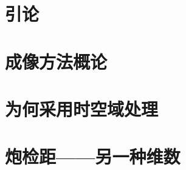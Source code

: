%
%




\pagestyle{empty}

\frontmatter

%


\tableofcontents
\cleardoublepage
{}
\listoffigures
\cleardoublepage
{}
\listoftables

\mainmatter
\pagestyle{body}


\chapter*{引论}



\chapter{成像方法概论}








\chapter{为何采用时空域处理}
\label{chap:why-time-space}










\chapter{炮检距——另一种维数}
\label{chap:offset}



\appendix



